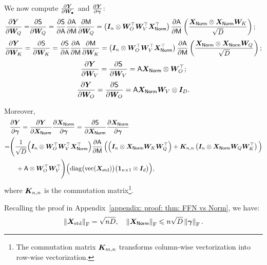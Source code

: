 We now compute $\frac{\partial \bY}{\partial\bW_{\bullet}}$ and $\frac{\partial \bY}{\partial\bgamma}$:
\begin{align*}
    \frac{\partial \bY}{\partial\bW_{Q}}=&\frac{\partial\SSA}{\partial\bW_{Q}}=\frac{\partial\SSA}{\partial\ASA}\frac{\partial\ASA}{\partial\MSA}\frac{\partial\MSA}{\partial\bW_{Q}}
    =\bracket{\bI_n\otimes \bW_O^\top\bW_V^\top\bX_{\LN}^\top}\frac{\partial\ASA}{\partial\MSA}\bracket{\frac{\bX_{\LN}\otimes \bX_{\LN} \bW_K}{\sqrt{D}}};
\end{align*}
\begin{align*}
    \frac{\partial \bY}{\partial\bW_{K}}=\frac{\partial\SSA}{\partial\bW_{K}}=\frac{\partial\SSA}{\partial\ASA}\frac{\partial\ASA}{\partial\MSA}\frac{\partial\MSA}{\partial\bW_{K}}
    =\bracket{\bI_n\otimes \bW_O^\top\bW_V^\top\bX_{\LN}^\top}\frac{\partial\ASA}{\partial\MSA}\bracket{\frac{\bX_{\LN}\otimes \bX_{\LN} \bW_Q}{\sqrt{D}}};
\end{align*}
\begin{align*}
    \frac{\partial \bY}{\partial\bW_{V}}=\frac{\partial\SSA}{\partial\bW_{V}}=\ASA\bX_{\LN}\otimes\bW_O^\top;
\end{align*}
\begin{align*}
    \frac{\partial \bY}{\partial\bW_{O}}=\frac{\partial\SSA}{\partial\bW_{O}}=\ASA\bX_{\LN}\bW_V\otimes\bI_D.
\end{align*}

Moreover,
\begin{align*}
    &\frac{\partial \bY}{\partial\bgamma}=\frac{\partial \bY}{\partial\bX_{\LN}}\frac{\partial \bX_{\LN}}{\partial\bgamma}
    =\frac{\partial\SSA}{\partial\bX_{\LN}}\frac{\partial \bX_{\LN}}{\partial\bgamma}
    \\=&\Bigg(\frac{1}{\sqrt{D}}\Big(\bI_n\otimes\bW_O^\top\bW_V^\top\bX_{\LN}^\top\Big)\frac{\partial\ASA}{\partial\MSA}\left(\Big(\bI_n\otimes\bX_{\LN}\bW_K\bW_Q^\top\right)+\bK_{n,n} \left(\bI_n\otimes\bX_{\LN}\bW_Q\bW_K^\top\right)\Big)
    \\&\quad+\ASA\otimes\bW_O^\top\bW_V^\top\Bigg)\Big(\diag\big(\vec(\bX_{\rm std})\big)\big(\bone_{n\times 1}\otimes \bI_{d}\big)\Big),
\end{align*}
where $\bK_{n,n}$ is the commutation matrix\footnote{The commutation matrix $\bK_{m,n}$ transforms column-wise vectorization into row-wise vectorization.}.


Recalling the proof in Appendix~\ref{appendix: proof: thm: FFN vs Norm}, we have:
\begin{align*}
    \norm{\bX_{\rm std}}_\rF=\sqrt{nD},
    \quad\norm{\bX_\LN}_\rF\leq n\sqrt{D}\norm{\bgamma}_\rF.
\end{align*}


